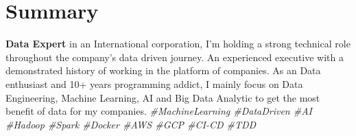 \section{Summary}
  \textbf{Data Expert} in an International corporation, I’m holding a strong technical role throughout the company’s data driven journey. An experienced executive with a demonstrated history of working in the platform of companies. As an Data enthusiast and 10+ years programming addict, I mainly focus on Data Engineering, Machine Learning, AI and Big Data Analytic to get the most benefit of data for my companies.
  \emph{\small{
    \#MachineLearning
    \#DataDriven
    \#AI
    \#Hadoop
    \#Spark
    \#Docker
    \#AWS
    \#GCP
    \#CI-CD
    \#TDD 
  }}
